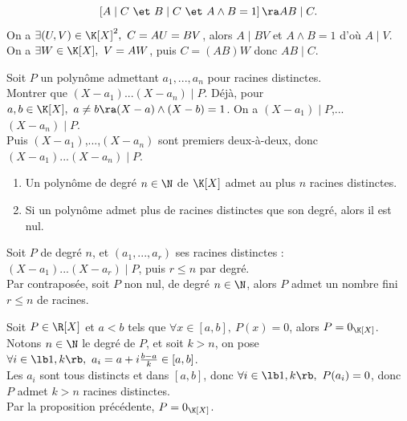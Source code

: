 \documentclass[11pt]{article}
\begin{document}
\vspace*{-0.8cm}

\begin{prop}{}{}
    \begin{equation*}
        \left[A\mid C ~\et~ B\mid C ~\et~ A\land B=1\right] \ra AB\mid C.
    \end{equation*}
    \tcblower
    On a $\exists (U,V)\in\K[X]^2, ~ C=AU=BV$, alors $A\mid BV$ et $A\land B = 1$ d'où $A\mid V$.\\
    On a $\exists W \in \K[X], ~ V=AW$, puis $C=(AB)W$ donc $AB\mid C$.
\end{prop}

\vspace*{-0.8cm}

\begin{ex}{}{}
    Soit $P$ un polynôme admettant $a_1,...,a_n$ pour racines distinctes.\\
    Montrer que $(X-a_1)...(X-a_n)\mid P$.
    \tcblower
    Déjà, pour $a,b\in\K[X], ~ a\neq b \ra (X-a)\land(X-b)=1$. On a $(X-a_1)\mid P$,...$(X-a_n)\mid P$.\\
    Puis $(X-a_1)$,...,$(X-a_n)$ sont premiers deux-à-deux, donc $(X-a_1)...(X-a_n)\mid P$.
\end{ex}

\vspace*{-0.8cm}

\begin{corr}{}{}
    \begin{enumerate}
        \item Un polynôme de degré $n\in\N$ de $\K[X]$ admet au plus $n$ racines distinctes.
        \item Si un polynôme admet plus de racines distinctes que son degré, alors il est nul.
    \end{enumerate}
    \tcblower
     Soit $P$ de degré $n$, et $(a_1,...,a_r)$ ses racines distinctes : $(X-a_1)...(X-a_r)\mid P$, puis $r\leq n$ par degré.\\
     Par contraposée, soit $P$ non nul, de degré $n\in\N$, alors $P$ admet un nombre fini $r\leq n$ de racines.
\end{corr}

\vspace*{-0.8cm}

\begin{ex}{}{}
    Soit $P\in\R[X]$ et $a<b$ tels que $\forall x \in [a,b], ~ P(x)=0$, alors $P=0_{\K[X]}$.
    \tcblower
    Notons $n\in\N$ le degré de $P$, et soit $k > n$, on pose $\forall i \in \lb1,k\rb, ~ a_i = a + i\frac{b-a}{k}\in[a,b]$.\\
    Les $a_i$ sont tous distincts et dans $[a,b]$, donc $\forall i \in \lb1,k\rb, ~ P(a_i)=0$, donc $P$ admet $k>n$ racines distinctes.\\
    Par la proposition précédente, $P=0_{\K[X]}$.  
\end{ex}
\end{document}
